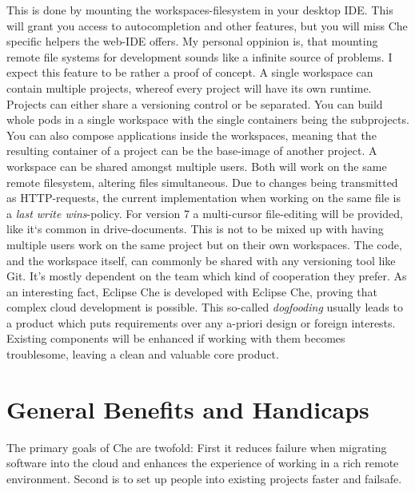 \documentclass[utf8]{lni}
\begin{document}
This is done by mounting the workspaces-filesystem  in  your  desktop  IDE. 
This  will grant you access to autocompletion and other features, but you will miss Che specific helpers the web-IDE offers. 
My personal oppinion is, that mounting remote file systems for development sounds like a infinite source of problems. 
I expect this feature to be rather a proof of concept.
A single workspace can contain multiple projects, whereof every project will have its own runtime. 
Projects can either share a versioning control or be separated. 
You can build whole pods in a single workspace with the single containers being the subprojects. 
You can also compose applications inside the workspaces, meaning that the resulting 
container of a project can be the base-image of another project. 
A workspace can be shared amongst multiple users. 
Both will work on the same remote filesystem, altering files simultaneous. 
Due to changes being transmitted as HTTP-requests, the current implementation when working on the same file is a \textit{last write wins}-policy. 
For version 7 a multi-cursor file-editing will be provided, like it`s common in 
drive-documents. 
This is not to be mixed up with having multiple users work on the same project but on their own workspaces. 
The code, and the workspace itself, can commonly be shared with any versioning tool like Git.
It's mostly dependent on the team which kind of cooperation they prefer. 
As  an  interesting  fact,  Eclipse  Che  is  developed  with Eclipse Che, proving that complex cloud development is possible. 
This so-called \textit{dogfooding} usually leads to a product which puts requirements over any a-priori design or foreign interests.  
Existing components will be enhanced if working with them becomes troublesome, leaving a clean and valuable core product. 

\section{General Benefits and Handicaps}
\label{sec:Eval}
The primary goals of Che are twofold: 
First it reduces failure when migrating software into the cloud and enhances the experience of working in a rich remote environment.
Second is to set up people into existing projects faster and failsafe.
\end{document}
